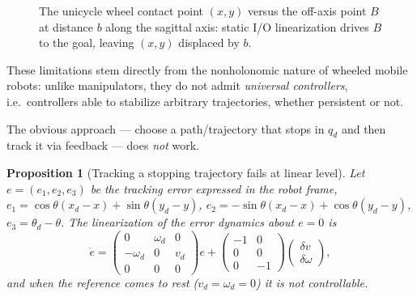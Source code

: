 \documentclass[11pt,a4paper]{article}
\def\bm#1{#1}%
\theoremstyle{definition}
\theoremstyle{plain}
\newtheorem{proposition}[definition]{Proposition}
\theoremstyle{remark}
\begin{document}
\begin{figure}[ht]
\centering
{}
\caption{The unicycle wheel contact point $(x,y)$ versus the off-axis point $B$ at distance $b$ along the sagittal axis: static I/O linearization drives $B$ to the goal, leaving $(x,y)$ displaced by $b$.}
\label{fig:pointB}
\end{figure}

These limitations stem directly from the nonholonomic nature of wheeled mobile robots: unlike manipulators, they do not admit \emph{universal controllers}, i.e.\ controllers able to stabilize arbitrary trajectories, whether persistent or not.
\begin{center}
\end{center}
The obvious approach --- choose a path/trajectory that stops in $\bm q_d$ and then track it via feedback --- does \emph{not} work.

\begin{proposition}[Tracking a stopping trajectory fails at linear level]\label{prop:stopfail}
Let $\bm e=(e_1,e_2,e_3)$ be the tracking error expressed in the robot frame, $e_1=\cos\theta(x_d-x)+\sin\theta(y_d-y)$, $e_2=-\sin\theta(x_d-x)+\cos\theta(y_d-y)$, $e_3=\theta_d-\theta$. The linearization of the error dynamics about $\bm e=\bm 0$ is
\[
\dot{\bm e}=\begin{pmatrix}0&\omega_d&0\\-\omega_d&0&v_d\\0&0&0\end{pmatrix}\bm e+\begin{pmatrix}-1&0\\0&0\\0&-1\end{pmatrix}\begin{pmatrix}\delta v\\ \delta\omega\end{pmatrix},
\]
and when the reference comes to rest ($v_d=\omega_d=0$) it is \emph{not controllable}.
\end{proposition}
\end{document}

